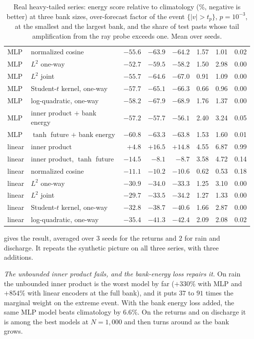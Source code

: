 \documentclass[11pt]{article}
\theoremstyle{plain}
\theoremstyle{definition}
\theoremstyle{remark}
\newcommand{\abs}[1]{\left\lvert #1 \right\rvert}
\begin{document}
\begin{table}[ht]
\begin{tabular}{llrrr|rr|c}
  MLP & normalized cosine & $-55.6$ & $-63.9$ & $-64.2$ & 1.57 & 1.01 & 0.02 \\
  MLP & $L^2$ one-way & $-52.7$ & $-59.5$ & $-58.2$ & 1.50 & 2.98 & 0.00 \\
  MLP & $L^2$ joint & $-55.7$ & $-64.6$ & $-67.0$ & 0.91 & 1.09 & 0.00 \\
  MLP & Student-$t$ kernel, one-way & $-57.7$ & $-65.1$ & $-66.3$ & 0.66 & 0.96 & 0.00 \\
  MLP & log-quadratic, one-way & $-58.2$ & $-67.9$ & $-68.9$ & 1.76 & 1.37 & 0.00 \\
  MLP & inner product $+$ bank energy & $-57.2$ & $-57.7$ & $-56.1$ & 2.40 & 3.24 & 0.05 \\
  MLP & $\tanh$ future $+$ bank energy & $-60.8$ & $-63.3$ & $-63.8$ & 1.53 & 1.60 & 0.01 \\
  \midrule
  linear & inner product & $+4.8$ & $+16.5$ & $+14.8$ & 4.55 & 6.87 & 0.99 \\
  linear & inner product, $\tanh$ future & $-14.5$ & $-8.1$ & $-8.7$ & 3.58 & 4.72 & 0.14 \\
  linear & normalized cosine & $-11.1$ & $-10.2$ & $-10.6$ & 0.62 & 0.53 & 0.18 \\
  linear & $L^2$ one-way & $-30.9$ & $-34.0$ & $-33.3$ & 1.25 & 3.10 & 0.00 \\
  linear & $L^2$ joint & $-29.7$ & $-33.5$ & $-34.2$ & 1.27 & 1.33 & 0.00 \\
  linear & Student-$t$ kernel, one-way & $-32.8$ & $-38.7$ & $-40.6$ & 1.66 & 2.87 & 0.00 \\
  linear & log-quadratic, one-way & $-35.4$ & $-41.3$ & $-42.4$ & 2.09 & 2.08 & 0.02 \\
  \bottomrule
 \end{tabular}
 \caption{Real heavy-tailed series: energy score relative to climatology
  (\%, negative is better) at three bank sizes, over-forecast factor of the
  event $\{\abs{v}>t_p\}$, $p=10^{-3}$, at the smallest and the largest bank,
  and the share of test pasts whose tail amplification from the ray probe
  exceeds one. Mean over seeds.}
 \label{tab:real}
\end{table}

 gives the result, averaged over $3$ seeds for the returns
and $2$ for rain and discharge. It repeats the synthetic picture on all
three series, with three additions.

\emph{The unbounded inner product fails, and the bank-energy loss repairs
it.} On rain the unbounded inner product is the worst model by far
($+330\%$ with MLP and $+854\%$ with linear encoders at the full bank), and it
puts $37$ to $91$ times the marginal weight on the extreme event. With the
bank energy loss added, the same MLP model beats climatology by $6.6\%$. On
the returns and on discharge it is among the best models at $N=1{,}000$ and
then turns around as the bank grows.
\end{document}
